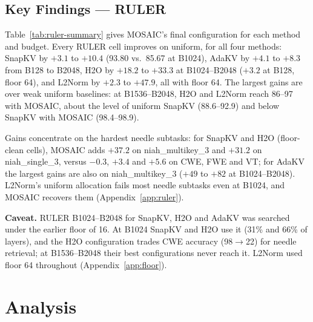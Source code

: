 \documentclass[11pt]{article}
\begin{document}
\subsection{Key Findings — RULER}

Table~\ref{tab:ruler-summary} gives MOSAIC's final configuration for each method and budget. Every RULER cell improves on uniform, for all four methods: SnapKV by $+3.1$ to $+10.4$ (93.80 vs.\ 85.67 at B1024), AdaKV by $+4.1$ to $+8.3$ from B128 to B2048, H2O by $+18.2$ to $+33.3$ at B1024--B2048 ($+3.2$ at B128, floor 64), and L2Norm by $+2.3$ to $+47.9$, all with floor 64. The largest gains are over weak uniform baselines: at B1536--B2048, H2O and L2Norm reach 86--97 with MOSAIC, about the level of uniform SnapKV (88.6--92.9) and below SnapKV with MOSAIC (98.4--98.9).

Gains concentrate on the hardest needle subtasks: for SnapKV and H2O (floor-clean cells), MOSAIC adds $+37.2$ on niah\_multikey\_3 and $+31.2$ on niah\_single\_3, versus $-0.3$, $+3.4$ and $+5.6$ on CWE, FWE and VT; for AdaKV the largest gains are also on niah\_multikey\_3 ($+49$ to $+82$ at B1024--B2048). L2Norm's uniform allocation fails most needle subtasks even at B1024, and MOSAIC recovers them (Appendix~\ref{app:ruler}).

\textbf{Caveat.} RULER B1024--B2048 for SnapKV, H2O and AdaKV was searched under the earlier floor of 16. At B1024 SnapKV and H2O use it (31\% and 66\% of layers), and the H2O configuration trades CWE accuracy (98$\rightarrow$22) for needle retrieval; at B1536--B2048 their best configurations never reach it. L2Norm used floor 64 throughout (Appendix~\ref{app:floor}).




\section{Analysis}

\end{document}
